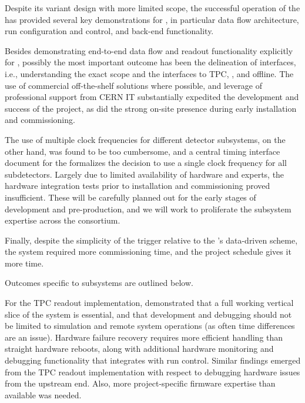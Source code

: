 Despite its %
variant design %
with more limited scope, the %
successful operation of the   has provided several key
demonstrations for  , in particular data flow
architecture, run configuration and control, and back-end
functionality. %

Besides demonstrating end-to-end data flow and  readout functionality
explicitly for  , possibly the most important outcome has been the delineation of
interfaces, i.e., understanding the exact  scope and the interfaces to TPC, , and offline. The use of commercial off-the-shelf solutions
where possible, and leverage of professional support from CERN IT 
substantially expedited the development and success of the project, as
did the strong on-site presence during early installation and
commissioning. 

The use of multiple clock frequencies for different
detector subsystems, on the other hand, was found to be too cumbersome, and 
a central timing interface document for the 
 \citedocdb{} formalizes the decision %
to use a single clock frequency for all  subdetectors.
Largely due to limited
availability of hardware and experts, the hardware integration tests prior to
installation and commissioning %
 proved insufficient. %
These will be %
carefully planned out for the early stages of   development and
pre-production, and we will work %
to proliferate the subsystem expertise across
the consortium. 

Finally, %
despite the simplicity of the  trigger 
relative to the 's data-driven  scheme, %
the system required more commissioning time, and  
the  project schedule gives it more time. 

Outcomes specific to  subsystems are outlined below.

For the  TPC readout implementation,  demonstrated that 
a full
working vertical slice of the system is essential, and that
development and debugging should not be limited to simulation and
remote system operations (as often time differences are an
issue). 
Hardware failure recovery requires more efficient handling %
than straight hardware reboots, along with %
additional
hardware monitoring and debugging functionality that integrates with
run control. Similar findings emerged from the   TPC readout implementation
with respect to debugging hardware issues from the  upstream end. %
Also,  %
more project-specific firmware expertise than available was needed.

